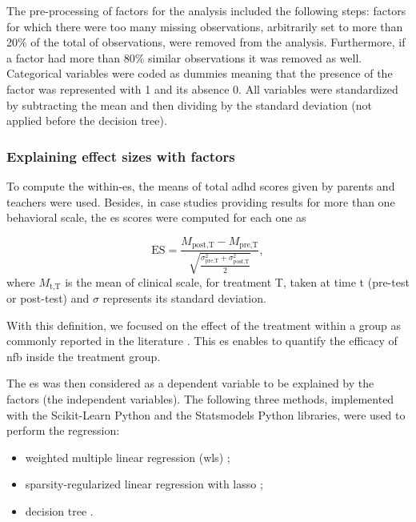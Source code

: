 The pre-processing of factors for the analysis included the following steps: factors for which there were too many 
missing observations, arbitrarily set to more than 20\% of the total of observations, were removed from the analysis. 
Furthermore, if a factor had more than 80\% similar observations it was removed as well. Categorical variables were 
coded as dummies meaning that the presence of the factor was represented with 1 and its absence 0. All variables 
were standardized by subtracting the mean and then dividing by the standard deviation (not applied before the decision tree).

\subsubsection{Explaining effect sizes with factors}

To compute the within-\gls{es}, the  means of total \gls{adhd} scores given by parents and teachers were used. Besides, 
in case studies providing results for more than one behavioral scale, the \gls{es} scores were computed for each one as 

\begin{equation*}
\label{eq:factors_effect_size_within_subject}
\text{ES} = \frac{M_{\text{post,T}} - M_{\text{pre,T}}}{\sqrt{\frac{\sigma_{\text{pre,T}}^2 + \sigma_{\text{post,T}}^2}{2}}},
\end{equation*} 
where $M_{\text{t,T}}$ is the mean of clinical scale, for treatment T, taken at time t (pre-test or post-test) and $\sigma$ represents 
its standard deviation.

With this definition, we focused on the effect of the treatment within a group \citep{Cohen1988} as commonly reported 
in the literature \citep{Arns2009, Maurizio2014, Strehl2017}. This \gls{es} enables to quantify 
the efficacy of \gls{nfb} inside the treatment group. 

The \gls{es} was then considered as a dependent variable to be explained by the factors (the independent variables). 
The following three methods, implemented with the Scikit-Learn Python \citep[version 0.18.1]{Pedregosa2011} and the Statsmodels Python
\citep[version 0.8.0]{Seabold2010} libraries, were used to perform the regression:
\begin{itemize}
  \item weighted multiple linear regression (\gls{wls}) \citep{Montgomery2012};
	\item sparsity-regularized linear regression with \gls{lasso} \citep{Tibshirani1996};
	\item decision tree \citep{Quinlan1986}.
\end{itemize}

